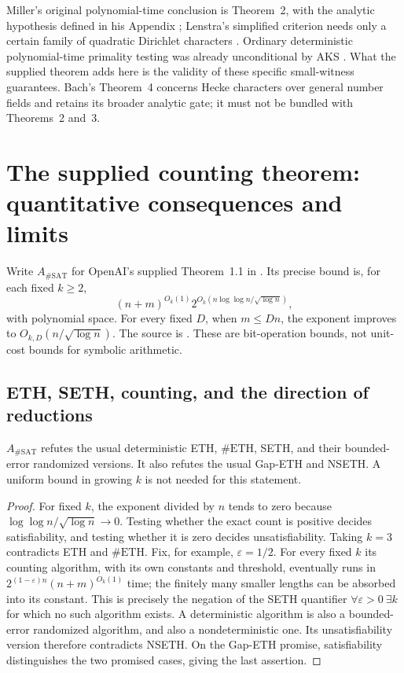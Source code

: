 Miller's original polynomial-time conclusion is Theorem~2, with the
analytic hypothesis defined in his Appendix \cite{CMiller76}; Lenstra's
simplified criterion needs only a certain family of quadratic Dirichlet
characters \cite[Theorem~1]{CLenstra79}.  Ordinary deterministic
polynomial-time primality testing was already unconditional by AKS
\cite[Theorems~4.1 and 5.1]{CAKS04}.  What the supplied theorem adds here
is the validity of these specific small-witness guarantees.  Bach's
Theorem~4 concerns Hecke characters over general number fields and retains
its broader analytic gate; it must not be bundled with Theorems~2 and~3.

\section{The supplied counting theorem: quantitative consequences and limits}
\label{sec:complexity-eth}

Write \(A_{\#\mathrm{SAT}}\) for OpenAI's supplied Theorem~1.1 in
.  Its precise
bound is, for each fixed \(k\ge2\),
\[
 (n+m)^{O_k(1)}2^{O_k(n\log\log n/\sqrt{\log n})},
\]
with polynomial space.  For every fixed \(D\), when \(m\le Dn\), the
exponent improves to \(O_{k,D}(n/\sqrt{\log n})\).  The source is
\cite[Theorem~1.1; Appendix~D]{COAI26}.  These are bit-operation bounds,
not unit-cost bounds for symbolic arithmetic.

\subsection{ETH, SETH, counting, and the direction of reductions}

\begin{proposition}
\(A_{\#\mathrm{SAT}}\) refutes the usual deterministic ETH, \(\#\mathrm{ETH}\),
SETH, and their bounded-error randomized versions.  It also refutes the
usual Gap-ETH and NSETH.  A uniform bound in growing \(k\) is not needed
for this statement.
\end{proposition}
\begin{proof}
For fixed \(k\), the exponent divided by \(n\) tends to zero because
\(\log\log n/\sqrt{\log n}\to0\).  Testing whether the exact count is
positive decides satisfiability, and testing whether it is zero decides
unsatisfiability.  Taking \(k=3\) contradicts ETH and \(\#\mathrm{ETH}\).
Fix, for example, \(\varepsilon=1/2\).  For every fixed \(k\) its counting
algorithm, with its own constants and threshold, eventually runs in
\(2^{(1-\varepsilon)n}(n+m)^{O_k(1)}\) time; the finitely many smaller
lengths can be absorbed into its constant.  This is precisely the
negation of the SETH quantifier
\(\forall\varepsilon>0\ \exists k\) for which no such algorithm exists.
A deterministic algorithm is also a bounded-error randomized algorithm,
and also a nondeterministic one.  Its unsatisfiability version therefore
contradicts NSETH.  On the Gap-ETH promise, satisfiability distinguishes
the two promised cases, giving the last assertion.
\end{proof}

